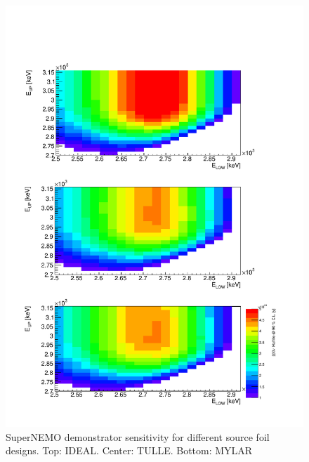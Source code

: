 \documentclass[main.tex]{subfiles}
\begin{document}
\begin{figure}[h!]
\centering
\includegraphics[scale=0.65]{pictures/Chap4/Sensitivity3Designs.pdf}
\caption{SuperNEMO demonstrator sensitivity for different source foil designs. Top: IDEAL. Center: TULLE. Bottom: MYLAR}
\label{Sens2D-3designs}
\end{figure}



\end{document}
